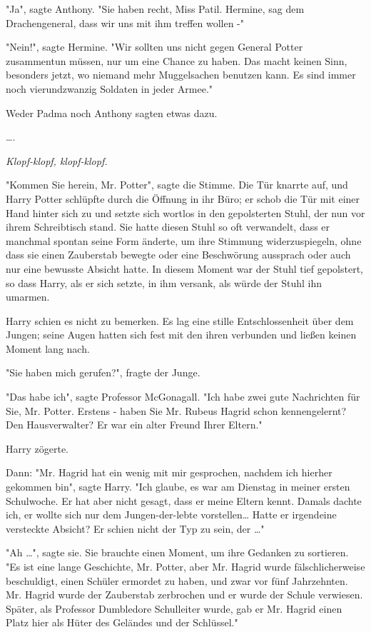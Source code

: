 {"Ja", sagte Anthony. "Sie haben recht, Miss Patil. Hermine, sag dem Drachengeneral, dass wir uns mit ihm treffen wollen -"

"Nein!", sagte Hermine. "Wir sollten uns nicht gegen General Potter zusammentun müssen, nur um eine Chance zu haben. Das macht keinen Sinn, besonders jetzt, wo niemand mehr Muggelsachen benutzen kann. Es sind immer noch vierundzwanzig Soldaten in jeder Armee."

Weder Padma noch Anthony sagten etwas dazu.

….

\emph{Klopf-klopf, klopf-klopf.}

"Kommen Sie herein, Mr. Potter", sagte die Stimme. Die Tür knarrte auf, und Harry Potter schlüpfte durch die Öffnung in ihr Büro; er schob die Tür mit einer Hand hinter sich zu und setzte sich wortlos in den gepolsterten Stuhl, der nun vor ihrem Schreibtisch stand. Sie hatte diesen Stuhl so oft verwandelt, dass er manchmal spontan seine Form änderte, um ihre Stimmung widerzuspiegeln, ohne dass sie einen Zauberstab bewegte oder eine Beschwörung aussprach oder auch nur eine bewusste Absicht hatte. In diesem Moment war der Stuhl tief gepolstert, so dass Harry, als er sich setzte, in ihm versank, als würde der Stuhl ihn umarmen.

Harry schien es nicht zu bemerken. Es lag eine stille Entschlossenheit über dem Jungen; seine Augen hatten sich fest mit den ihren verbunden und ließen keinen Moment lang nach.

"Sie haben mich gerufen?", fragte der Junge.

"Das habe ich", sagte Professor McGonagall. "Ich habe zwei gute Nachrichten für Sie, Mr. Potter. Erstens - haben Sie Mr. Rubeus Hagrid schon kennengelernt? Den Hausverwalter? Er war ein alter Freund Ihrer Eltern."

Harry zögerte.

Dann: "Mr. Hagrid hat ein wenig mit mir gesprochen, nachdem ich hierher gekommen bin", sagte Harry. "Ich glaube, es war am Dienstag in meiner ersten Schulwoche. Er hat aber nicht gesagt, dass er meine Eltern kennt. Damals dachte ich, er wollte sich nur dem Jungen-der-lebte vorstellen… Hatte er irgendeine versteckte Absicht? Er schien nicht der Typ zu sein, der …"

"Ah …", sagte sie. Sie brauchte einen Moment, um ihre Gedanken zu sortieren. "Es ist eine lange Geschichte, Mr. Potter, aber Mr. Hagrid wurde fälschlicherweise beschuldigt, einen Schüler ermordet zu haben, und zwar vor fünf Jahrzehnten. Mr. Hagrid wurde der Zauberstab zerbrochen und er wurde der Schule verwiesen. Später, als Professor Dumbledore Schulleiter wurde, gab er Mr. Hagrid einen Platz hier als Hüter des Geländes und der Schlüssel."

}
